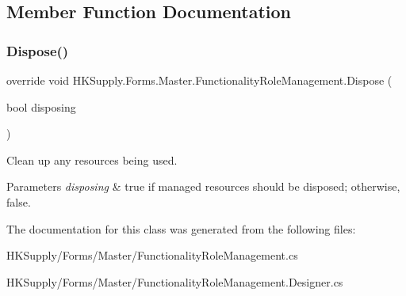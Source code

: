 \subsection{Member Function Documentation}
\mbox{\label{class_h_k_supply_1_1_forms_1_1_master_1_1_functionality_role_management_a9a7c00e015e462fba8baf1e25be79413}} 
\subsubsection{\texorpdfstring{Dispose()}{Dispose()}}
{\footnotesize\ttfamily override void H\+K\+Supply.\+Forms.\+Master.\+Functionality\+Role\+Management.\+Dispose (\begin{DoxyParamCaption}\item[{bool}]{disposing }\end{DoxyParamCaption})\hspace{0.3cm}{\ttfamily [protected]}}



Clean up any resources being used. 


\begin{DoxyParams}{Parameters}
{\em disposing} & true if managed resources should be disposed; otherwise, false.\\
\hline
\end{DoxyParams}


The documentation for this class was generated from the following files\+:\begin{DoxyCompactItemize}
\item 
H\+K\+Supply/\+Forms/\+Master/Functionality\+Role\+Management.\+cs\item 
H\+K\+Supply/\+Forms/\+Master/Functionality\+Role\+Management.\+Designer.\+cs\end{DoxyCompactItemize}
